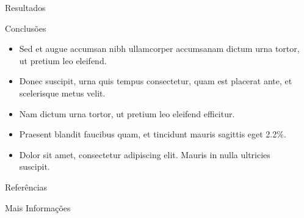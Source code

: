 \documentclass[final]{beamer}
\newlength{\sepwidth}
\newlength{\colwidth}
\newcommand{\separatorcolumn}{\begin{column}{\sepwidth}\end{column}}
\begin{document}
\begin{frame}[t]
\begin{columns}[t]
\begin{column}{\colwidth}
\begin{block}{Resultados}
\begin{figure}
	\end{figure}
\end{block}
\begin{exampleblock}{Conclusões}
    \begin{itemize}
      \item Sed et augue accumsan nibh ullamcorper accumsanam dictum urna tortor, ut pretium leo eleifend.  
      \item Donec suscipit, urna quis tempus consectetur, quam est placerat ante, et scelerisque metus velit. 
      \item Nam dictum urna tortor, ut pretium leo eleifend efficitur.
      \item Praesent blandit faucibus quam, et tincidunt mauris sagittis eget 2.2\%.
      \item Dolor sit amet, consectetur adipiscing elit. Mauris in nulla ultricies suscipit.
    \end{itemize}
\end{exampleblock}
\begin{block}{Referências}
\begin{multicols}{2}
    \footnotesize
    
    
\end{multicols}
\end{block}
\begin{block}{Mais Informações}
    
\end{block}
\end{column}
\separatorcolumn
\end{columns}
\end{frame}
\end{document}
